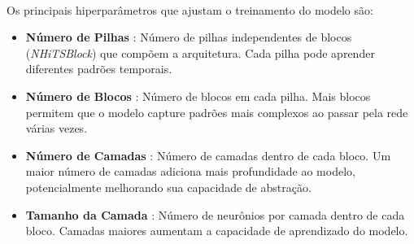 \paragraph{} Os principais hiperparâmetros que ajustam o treinamento do modelo são:
\begin{itemize}
	\item \textbf{Número de Pilhas} : Número de pilhas independentes de blocos (\textit{NHiTSBlock}) que compõem a arquitetura. Cada pilha pode aprender diferentes padrões temporais.
	\item \textbf{Número de Blocos} : Número de blocos em cada pilha. Mais blocos permitem que o modelo capture padrões mais complexos ao passar pela rede várias vezes.
	\item \textbf{Número de Camadas} : Número de camadas dentro de cada bloco. Um maior número de camadas adiciona mais profundidade ao modelo, potencialmente melhorando sua capacidade de abstração.
	\item \textbf{Tamanho da Camada} : Número de neurônios por camada dentro de cada bloco. Camadas maiores aumentam a capacidade de aprendizado do modelo.
\end{itemize}